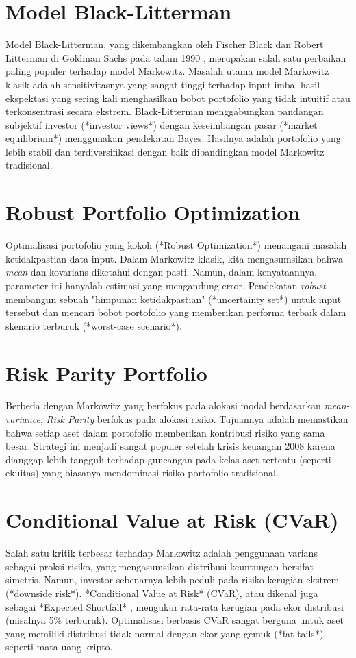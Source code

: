 \documentclass[12pt,a4paper]{book}
\begin{document}
\section{Model Black-Litterman}
Model Black-Litterman, yang dikembangkan oleh Fischer Black dan Robert Litterman di Goldman Sachs pada tahun 1990 \cite{black1992global}, merupakan salah satu perbaikan paling populer terhadap model Markowitz. Masalah utama model Markowitz klasik adalah sensitivitasnya yang sangat tinggi terhadap input imbal hasil ekspektasi yang sering kali menghasilkan bobot portofolio yang tidak intuitif atau terkonsentrasi secara ekstrem.
Black-Litterman menggabungkan pandangan subjektif investor (*investor views*) dengan keseimbangan pasar (*market equilibrium*) menggunakan pendekatan Bayes. Hasilnya adalah portofolio yang lebih stabil dan terdiversifikasi dengan baik dibandingkan model Markowitz tradisional.

\section{Robust Portfolio Optimization}
Optimalisasi portofolio yang kokoh (*Robust Optimization*) menangani masalah ketidakpastian data input. Dalam Markowitz klasik, kita mengasumsikan bahwa \textit{mean} dan kovarians diketahui dengan pasti. Namun, dalam kenyataannya, parameter ini hanyalah estimasi yang mengandung error.
Pendekatan \textit{robust} membangun sebuah "himpunan ketidakpastian" (*uncertainty set*) untuk input tersebut dan mencari bobot portofolio yang memberikan performa terbaik dalam skenario terburuk (*worst-case scenario*).

\section{Risk Parity Portfolio}
Berbeda dengan Markowitz yang berfokus pada alokasi modal berdasarkan \textit{mean-variance}, \textit{Risk Parity} berfokus pada alokasi risiko. Tujuannya adalah memastikan bahwa setiap aset dalam portofolio memberikan kontribusi risiko yang sama besar. Strategi ini menjadi sangat populer setelah krisis keuangan 2008 karena dianggap lebih tangguh terhadap guncangan pada kelas aset tertentu (seperti ekuitas) yang biasanya mendominasi risiko portofolio tradisional.

\section{Conditional Value at Risk (CVaR)}
Salah satu kritik terbesar terhadap Markowitz adalah penggunaan varians sebagai proksi risiko, yang mengasumsikan distribusi keuntungan bersifat simetris. Namun, investor sebenarnya lebih peduli pada risiko kerugian ekstrem (*downside risk*).
*Conditional Value at Risk* (CVaR), atau dikenal juga sebagai *Expected Shortfall* \cite{rockafellar2000optimization}, mengukur rata-rata kerugian pada ekor distribusi (misalnya 5\% terburuk). Optimalisasi berbasis CVaR sangat berguna untuk aset yang memiliki distribusi tidak normal dengan ekor yang gemuk (*fat tails*), seperti mata uang kripto.
\end{document}
